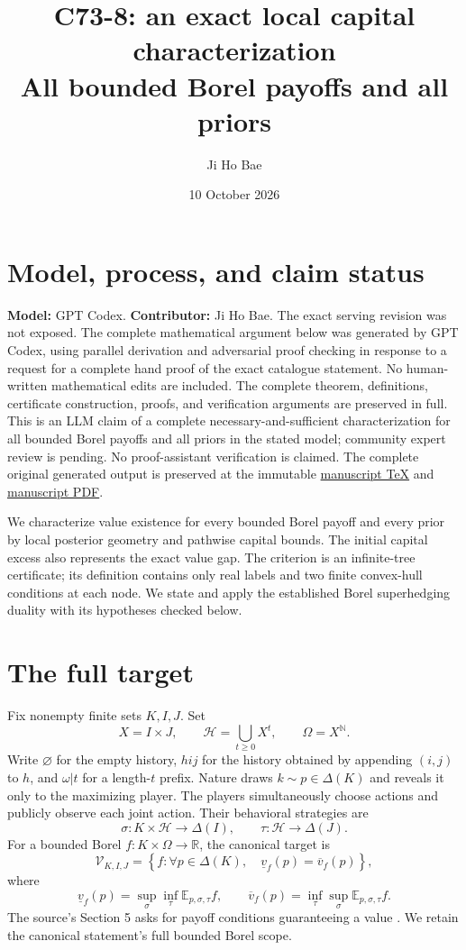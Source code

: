\documentclass[11pt,a4paper]{article}
\title{C73-8: an exact local capital characterization\\[3pt]
\large All bounded Borel payoffs and all priors}
\author{Ji Ho Bae}
\date{10 October 2026}
\theoremstyle{definition}
\newcommand{\R}{\mathbb R}
\newcommand{\N}{\mathbb N}
\newcommand{\E}{\mathbb E}
\newcommand{\HH}{\mathcal H}
\newcommand{\lv}{\underline v}
\newcommand{\uv}{\overline v}
\begin{document}
\maketitle
\section*{Model, process, and claim status}
\noindent\textbf{Model:} GPT Codex. \textbf{Contributor:} Ji Ho Bae.
The exact serving revision was not exposed.
The complete mathematical argument below was generated by GPT Codex,
using parallel derivation and adversarial proof checking in response to a
request for a complete hand proof of the exact catalogue statement.
No human-written mathematical edits are included. The complete theorem,
definitions, certificate construction, proofs, and verification arguments
are preserved in full.
This is an LLM claim of a complete necessary-and-sufficient
characterization for all bounded Borel payoffs and all priors in the
stated model; community expert review is pending.
No proof-assistant verification is claimed.
The complete original generated output is preserved at the immutable
\href{https://github.com/jbaelaw/borel-game-value-characterization/blob/4ea46a1e7f4c898860201c820a34a34cd5a465df/paper/Proof.tex}{manuscript TeX}
and \href{https://github.com/jbaelaw/borel-game-value-characterization/blob/4ea46a1e7f4c898860201c820a34a34cd5a465df/paper/Proof.pdf}{manuscript PDF}.


We characterize value existence for every bounded Borel payoff and every
prior by local posterior geometry and pathwise capital bounds.
The initial capital excess also represents the exact value gap.
The criterion is an infinite-tree certificate; its definition contains
only real labels and two finite convex-hull conditions at each node.
We state and apply the established Borel superhedging duality with its
hypotheses checked below.

\section{The full target}

Fix nonempty finite sets $K,I,J$. Set
\[
 X=I\times J,\qquad \HH=\bigcup_{t\geq0}X^t,
 \qquad \Omega=X^{\N}.
\]
Write $\varnothing$ for the empty history, $hij$ for the history obtained
by appending $(i,j)$ to $h$, and $\omega|t$ for a length-$t$ prefix.
Nature draws $k\sim p\in\Delta(K)$ and reveals it only to the maximizing
player. The players simultaneously choose actions and publicly observe
each joint action. Their behavioral strategies are
\[
 \sigma:K\times\HH\longrightarrow\Delta(I),\qquad
 \tau:\HH\longrightarrow\Delta(J).
\]
For a bounded Borel $f:K\times\Omega\to\R$, the canonical target is
\[
 \mathcal V_{K,I,J}=\left\{f:
 \forall p\in\Delta(K),\quad
 \lv_f(p)=\uv_f(p)\right\},
\]
where
\[
 \lv_f(p)=\sup_\sigma\inf_\tau\E_{p,\sigma,\tau} f,
 \qquad
 \uv_f(p)=\inf_\tau\sup_\sigma\E_{p,\sigma,\tau} f.
\]
The source's Section 5 asks for payoff conditions guaranteeing a value
\cite{KLS}. We retain the canonical statement's full bounded Borel scope.
\end{document}
